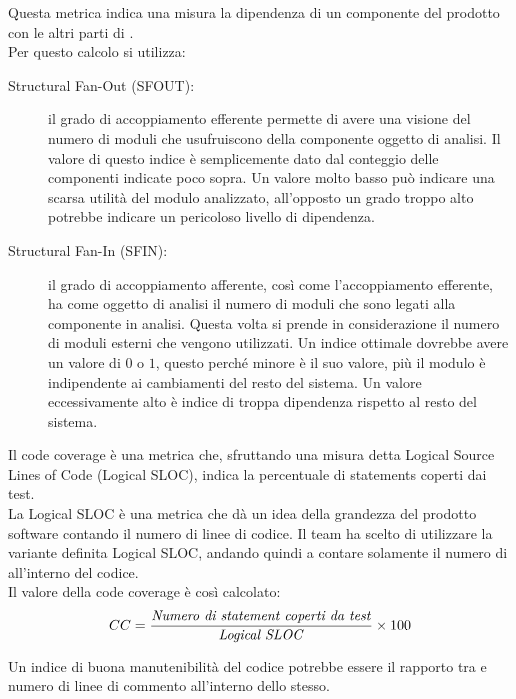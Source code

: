 			Questa metrica indica una misura la dipendenza di un componente del prodotto con le altri parti di \ProjectName{}.\\
			Per questo calcolo si utilizza:
			\begin{description}
				\item[Structural Fan-Out (SFOUT): ] 
					il grado di accoppiamento efferente permette di avere una 
					visione del numero di moduli che usufruiscono della componente oggetto di analisi.
					Il valore di questo indice è semplicemente dato dal conteggio delle componenti indicate 
					poco sopra. Un valore molto basso può indicare una scarsa utilità del modulo analizzato, 
					all'opposto un grado troppo alto potrebbe indicare un pericoloso livello di dipendenza.
				
				\item[Structural Fan-In (SFIN): ]
					il grado di accoppiamento afferente, così come l'accoppiamento efferente, ha come oggetto di 
					analisi il numero di moduli che sono legati alla componente in analisi.
					Questa volta si prende in considerazione il numero di moduli esterni che vengono utilizzati.
					Un indice ottimale dovrebbe avere un valore di $0$ o $1$, questo perché minore è il suo valore, 
					più il modulo è indipendente ai cambiamenti del resto del sistema. Un valore eccessivamente alto 
					è indice di troppa dipendenza rispetto al resto del sistema.
			\end{description}

			Il code coverage è una metrica che, sfruttando una misura detta Logical Source Lines of Code (Logical SLOC), 
			indica la percentuale di statements coperti dai test.\\
			
			La Logical SLOC è una metrica che dà un idea della grandezza del prodotto software contando il numero di linee di codice. 
			Il team ha scelto di utilizzare la variante definita Logical SLOC, andando quindi a contare solamente 
			il numero di  all'interno del codice.\\			

			Il valore della code coverage è così calcolato:
			\[ CC = \frac{\mbox{\textit{Numero di statement coperti da test}}}{\mbox{\textit{Logical SLOC}}} \times 100 \]

			Un indice di buona manutenibilità del codice potrebbe essere il rapporto tra  
			e numero di linee di commento all'interno dello stesso.

